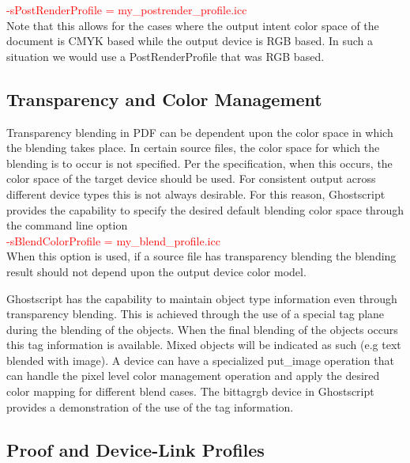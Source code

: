 \documentclass[12pt,notitlepage]{article}
\begin{document}
\textcolor{red}{-sPostRenderProfile = my\_postrender\_profile.icc}\\

Note that this allows for the cases where the output intent color space of the document is CMYK based while the output device is RGB based.  In such a situation we would use a PostRenderProfile that was RGB based.

\subsection{Transparency and Color Management}
\label{sec:Transparency}
Transparency blending in PDF can be dependent upon the color space in which the blending takes place.  In certain source files, the color space for which the blending is to occur is not specified.  Per the specification, when this occurs, the color space of the target device should be used.   For consistent output across different device types this is not always desirable.   For this reason, Ghostscript provides the capability to specify the desired default blending color space through the command line option\\

\textcolor{red}{-sBlendColorProfile = my\_blend\_profile.icc}\\

\noindent When this option is used, if a source file has transparency blending the blending result should not depend upon the output device color model.

Ghostscript has the capability to maintain object type information even through transparency blending.  This is achieved through the use of a special tag plane during the blending of the objects.  When the final blending of the objects occurs this tag information is available.  Mixed objects will be indicated as such (e.g text blended with image).  A device can have a specialized put\_image operation that can handle the pixel level color management operation and apply the desired color mapping for different blend cases.  The bittagrgb device in Ghostscript provides a demonstration of the use of the tag information.

\subsection{Proof and Device-Link Profiles}
\label{sec:proof_link}
\end{document}
